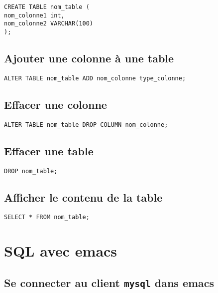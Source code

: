 \documentclass[11pt]{article}
\begin{document}
\begin{verbatim}
CREATE TABLE nom_table (
nom_colonne1 int,
nom_colonne2 VARCHAR(100)
);
\end{verbatim}

\subsection{Ajouter une colonne à une table}
\label{sec:org47eb1be}
\begin{verbatim}
ALTER TABLE nom_table ADD nom_colonne type_colonne;
\end{verbatim}

\subsection{Effacer une colonne}
\label{sec:org93d4b91}
\begin{verbatim}
ALTER TABLE nom_table DROP COLUMN nom_colonne;
\end{verbatim}

\subsection{Effacer une table}
\label{sec:org536ac8a}
\begin{verbatim}
DROP nom_table;
\end{verbatim}

\subsection{Afficher le contenu de la table}
\label{sec:org96ac0e3}
\begin{verbatim}
SELECT * FROM nom_table;
\end{verbatim}


\section{SQL avec emacs}
\label{sec:org8198105}

\subsection{Se connecter au client \texttt{mysql} dans emacs}
\label{sec:orge07b911}
\end{document}
